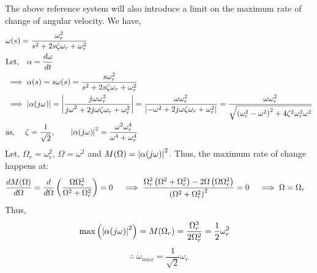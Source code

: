 The above reference system will also introduce a limit on the maximum rate of
change of angular velocity. We have,
\begin{align*}
    &\omega(s) = \frac{\omega_{r}^2}{s^2 + 2 s \zeta \omega_{r} + \omega_{r}^2}\\
    &\text{Let,} \quad \alpha = \frac{d \omega }{dt}
    \\
    &\implies \alpha(s) = s \omega(s) =  \frac{s\omega_{r}^2}{s^2 + 2 s \zeta \omega_{r} + \omega_{r}^2}
    \\
    &\implies \left\lvert \alpha(j\omega) \right\rvert = \left\lvert \frac{j \omega \omega_{r}^2}{{j \omega}^2 + 2 j \omega  \zeta \omega_{r} + \omega_{r}^2} \right\rvert
    = \frac{\omega \omega_r^2}{\left\lvert -\omega^2 + 2 j \omega  \zeta \omega_{r} + \omega_{r}^2 \right\rvert}
    = \frac{\omega \omega_r^2}{\sqrt{\left( \omega_r^2 - \omega^2 \right)^2 + 4 \zeta^2 \omega_r^2 \omega^2}}
    \\
    &\text{as, }\quad \zeta = \frac{1}{\sqrt{2}},
    \qquad
    \left\lvert \alpha(j \omega) \right\rvert^2 = \frac{\omega^2 \omega_r^4}{\omega^4 + \omega_r^4}
\end{align*}
Let, $\Omega_r = \omega_r^2$, $\Omega = \omega^2$ and $M(\Omega) =
\left\lvert \alpha(j\omega) \right\rvert^2$.
Thus, the maximum rate of change happens at:
\begin{align*}
    &\frac{d M(\Omega)}{d \Omega} = \frac{d}{d \Omega} \left( \frac{\Omega \Omega_r^2}{\Omega^2 + \Omega_r^2} \right) = 0
    \quad
    \implies \frac{\Omega_r^2 \left( \Omega^2 + \Omega_r^2 \right) - 2 \Omega \left( \Omega \Omega_r^2 \right)}{\left( \Omega^2 + \Omega_r^2 \right)^2} = 0
    \quad
    \implies \Omega = \Omega_r
\end{align*}
Thus,
\begin{align*}
    \max \left( { \left\lvert \alpha(j \omega) \right\rvert^2 } \right) &= M(\Omega_r) = \frac{\Omega_r^3}{2 \Omega_r^2} = \frac{1}{2} \omega_r^2
\end{align*}
\begin{equation}\label{eqn::max_bandwidth}
    \therefore \; \dot \omega_{max} = \frac{1}{\sqrt{2}} \omega_r
\end{equation}
